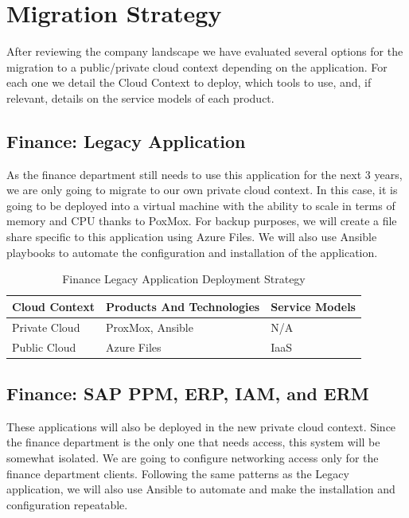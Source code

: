 \documentclass{llncs}
\begin{document}
\section{Migration Strategy}

After reviewing the company landscape we have evaluated several options for the migration to a public/private cloud context depending on the application.
For each one we detail the Cloud Context to deploy, which tools to use, and, if relevant, details on the service models of each product.

\subsection{Finance: Legacy Application}

As the finance department still needs to use this application for the next 3 years, we are only going to migrate to our own private cloud context.
In this case, it is going to be deployed into a virtual machine with the ability to scale in terms of memory and CPU thanks to PoxMox.
For backup purposes, we will create a file share specific to this application using Azure Files.
We will also use Ansible playbooks to automate the configuration and installation of the application.\\

\begin{table}[h!]
    \centering
    \begin{tabular}{lll}
        \hline
        \textbf{Cloud Context} & \textbf{Products And Technologies} & \textbf{Service Models} \\
        \hline
        Private Cloud          & ProxMox, Ansible                   & N/A                     \\
        \hline
        Public Cloud           & Azure Files                        & IaaS                    \\
        \hline
    \end{tabular}
    \caption{Finance Legacy Application Deployment Strategy}
\end{table}


\subsection{Finance: SAP PPM, ERP, IAM, and ERM}
These applications will also be deployed in the new private cloud context.
Since the finance department is the only one that needs access, this system will be somewhat isolated.
We are going to configure networking access only for the finance department clients.
Following the same patterns as the Legacy application, we will also use Ansible to automate and make the installation and configuration repeatable.\\
\end{document}
